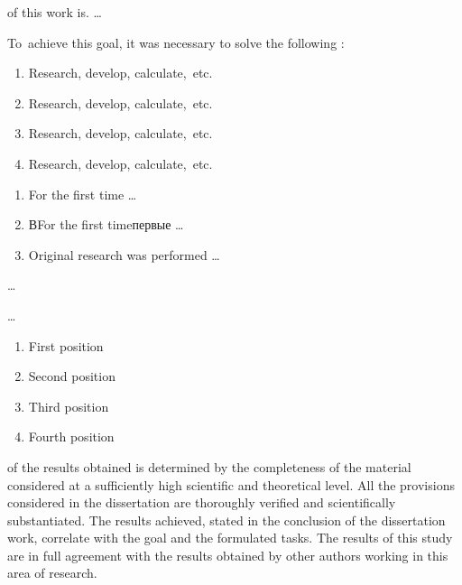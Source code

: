 
{\aimEn} of this work is. \ldots

To~achieve this goal, it was necessary to solve the following {\tasksEn}:
\begin{enumerate}[beginpenalty=10000] %
  \item Research, develop, calculate,~etc.
  \item Research, develop, calculate,~etc.
  \item Research, develop, calculate,~etc.
  \item Research, develop, calculate,~etc.
\end{enumerate}


{\noveltyEn}
\begin{enumerate}[beginpenalty=10000] %
  \item For the first time \ldots
  \item ВFor the first timeпервые \ldots
  \item Original research was performed \ldots
\end{enumerate}

{\influenceEn} \ldots

{\methodsEn} \ldots

{}
\begin{enumerate}[beginpenalty=10000] %
	\item First position
	\item Second position
	\item Third position
	\item Fourth position
\end{enumerate}

{\reliabilityEn} of the results obtained is determined by the completeness of the material considered at a sufficiently high scientific and theoretical level. All the provisions considered in the dissertation are thoroughly verified and scientifically substantiated. The results achieved, stated in the conclusion of the dissertation work, correlate with the goal and the formulated tasks. The results of this study are in full agreement with the results obtained by other authors working in this area of research.


